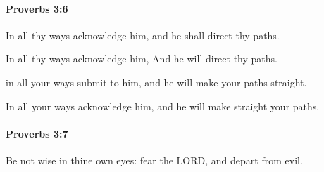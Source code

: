 		\paragraph{Proverbs 3:6} %
			\label{PROVERBS-3-6}

			In all thy ways acknowledge him, and he shall direct thy paths.

			\begin{versebox}
					\item[BHS] 
					\item[ASV] In all thy ways acknowledge him, And he will direct thy paths.
					\item[NIV] in all your ways submit to him, and he will make your paths straight.
					\item[NRSV] In all your ways acknowledge him, and he will make straight your paths.
			\end{versebox}

		\paragraph{Proverbs 3:7} %
			\label{PROVERBS-3-7}

			Be not wise in thine own eyes: fear the LORD, and depart from evil.

